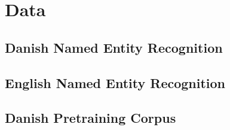 \documentclass[main.tex]{subfiles}
\begin{document}
\chapter{Data}

\section{Danish Named Entity Recognition}

\section{English Named Entity Recognition}

\section{Danish Pretraining Corpus}
\end{document}
